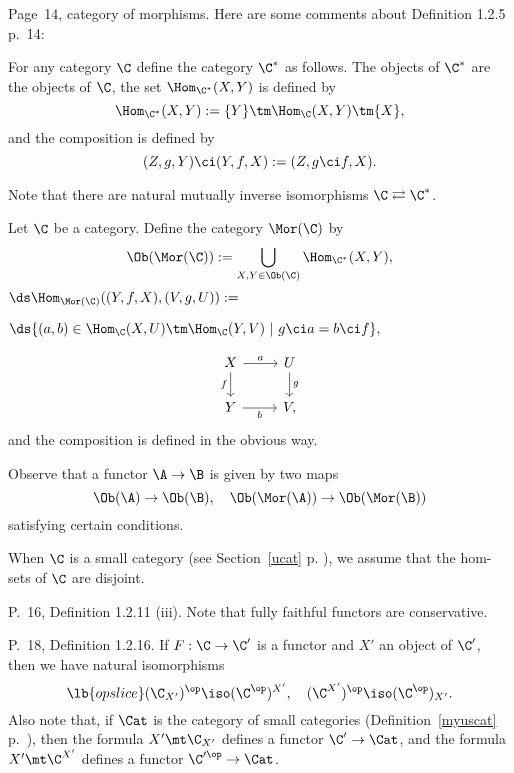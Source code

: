 \documentclass[12pt]{article}
\theoremstyle{remark}
\theoremstyle{definition}
\begin{document}


\begin{s}
Page~14, category of morphisms. Here are some comments about Definition 1.2.5 p.~14:

\begin{nota}
For any category $\C$ define the category $\C^*$\index{$\C^*$} as follows. The objects of $\C^*$ are the objects of $\C$, the set $\Hom_{\C^*}(X,Y)$ is defined by 
$$
\Hom_{\C^*}(X,Y):=\{Y\}\tm\Hom_{\C}(X,Y)\tm\{X\},
$$
and the composition is defined by 
$$
(Z,g,Y)\ci(Y,f,X):=(Z,g\ci f,X).
$$ 
\end{nota}

Note that there are natural mutually inverse isomorphisms $\C\rightleftarrows\C^*$. 

\begin{nota}
Let $\C$ be a category. Define the category $\Mor(\C)$ \index{$\Mor$} by 
$$
\Ob(\Mor(\C)):=\bigcup_{X,Y\in\Ob(\C)}\Hom_{\C^*}(X,Y),
$$
$\ds\Hom_{\Mor(\C)}((Y,f,X),(V,g,U)):=$\bigskip 

$\hfill\ds\{(a,b)\in\Hom_\C(X,U)\tm\Hom_\C(Y,V)\ | \ g\ci a=b\ci f\},$\bigskip

$$
\begin{tikzcd}
X\ar{d}[swap]{f}\ar{r}{a}&U\ar{d}{g}\\ 
Y\ar{r}[swap]{b}&V,
\end{tikzcd}
$$ 
and the composition is defined in the obvious way.
\end{nota}

Observe that a functor $\A\to\B$ is given by two maps 
$$
\Ob(\A)\to\Ob(\B),\quad\Ob(\Mor(\A))\to\Ob(\Mor(\B))
$$ 
satisfying certain conditions.

When $\C$ is a small category (see Section~\ref{ucat} p. ), we assume that the hom-sets of $\C$ are disjoint.
\end{s}

%

\begin{s}
P.~16, Definition 1.2.11 (iii). Note that fully faithful functors are conservative. 
\end{s}

%

\begin{s}
P.~18, Definition 1.2.16. If $F:\C\to\C'$ is a functor and $X'$ an object of $\C'$, then we have natural isomorphisms 
\begin{equation}\lb{opslice}
(\C_{X'})^{\op}\iso(\C^{\op})^{X'},\quad(\C^{X'})^{\op}\iso(\C^{\op})_{X'}.
\end{equation} 
Also note that, if $\Cat$ is the category of small categories (Definition~\ref{myuscat} p.~), then the formula $X'\mt\C_{X'}$ defines a functor $\C'\to\Cat$, and the formula $X'\mt\C^{X'}$ defines a functor $\C'^{\op}\to\Cat$.
\end{s}
\end{document}
